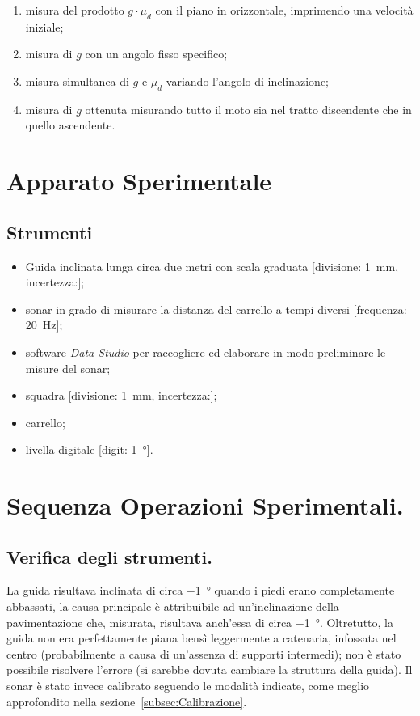 \documentclass[10pt,oneside,a4paper]{article}
\begin{document}
\begin{enumerate}
	\item misura del prodotto $g \cdot \mu_d$ con il piano in orizzontale, imprimendo una velocità iniziale;
	\item misura di $g$ con un angolo fisso specifico;
	\item misura simultanea di $g$ e $\mu_d$ variando l'angolo di inclinazione;
	\item misura di $g$ ottenuta misurando tutto il moto sia nel tratto discendente che in quello ascendente.
\end{enumerate}
	
\section{Apparato Sperimentale}
	
\subsection{Strumenti}
\label{subsec:strumenti}
\begin{itemize}
	\item Guida inclinata lunga circa due metri con scala graduata [divisione: \SI{1}{mm}, incertezza:];
	\item sonar in grado di misurare la distanza del carrello a tempi diversi [frequenza: \SI{20}{Hz}];
	\item software \emph{Data Studio} per raccogliere ed elaborare in modo preliminare le misure del sonar;
	\item squadra [divisione: \SI{1}{mm}, incertezza:];
	\item carrello;
	\item livella digitale [digit: \SI{1}{°}].
\end{itemize}

\section{Sequenza Operazioni Sperimentali.}

\subsection{Verifica degli strumenti.}
\label{subsec:verifica}
La guida risultava inclinata di circa \SI{-1}{°} quando i piedi erano completamente abbassati, la causa principale è attribuibile ad un'inclinazione della pavimentazione che, misurata, risultava anch'essa di circa \SI{-1}{°}. %
Oltretutto, la guida non era perfettamente piana bensì leggermente a catenaria, infossata nel centro (probabilmente a causa di un'assenza di supporti intermedi); non è stato possibile risolvere l'errore (si sarebbe dovuta cambiare la struttura della guida).
Il sonar è stato invece calibrato seguendo le modalità indicate, come meglio approfondito nella sezione~\ref{subsec:Calibrazione}.
\end{document}
